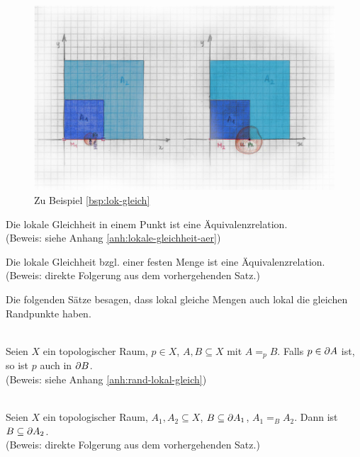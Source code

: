 %    
    \begin{figure}[ht]
        \centering
        \includegraphics[width=\textwidth]{abb/lok-gleich.png}
        \caption{Zu Beispiel \ref{bsp:lok-gleich}}
        \label{fig:lok-gleich}
    \end{figure}
%
    \begin{satz}\label{satz:lokale-gleichheit-aer}
        Die lokale Gleichheit in einem Punkt ist eine Äquivalenzrelation.\\
        (Beweis: siehe Anhang \ref{anh:lokale-gleichheit-aer})
    \end{satz}
%  
    \begin{kor}\label{kor:lokale-gleichheit-aer}
     Die lokale Gleichheit bzgl. einer festen Menge ist eine Äquivalenzrelation.\\
     (Beweis: direkte Folgerung aus dem vorhergehenden Satz.)
    \end{kor}
%    
    Die folgenden Sätze besagen, dass lokal gleiche Mengen auch lokal die gleichen Randpunkte haben.
%
    \begin{satz}\label{satz:rand-lokal-gleich}\ \\
        Seien $X$ ein topologischer Raum, $p \in X$, $A,B \subseteq X$ mit $A =_p B$. Falls $p \in \partial A$ ist, so ist $p$ auch in $\partial B$.\\
        (Beweis: siehe Anhang \ref{anh:rand-lokal-gleich})
    \end{satz}
%  
    \begin{kor}\ \\ 
        Seien $X$ ein topologischer Raum, $A_1, A_2 \subseteq X$, $B \subseteq \partial A_1$, $A_1 =_{B} A_2$. Dann ist $B \subseteq \partial A_2$.\\
        (Beweis: direkte Folgerung aus dem vorhergehenden Satz.)
    \end{kor}


